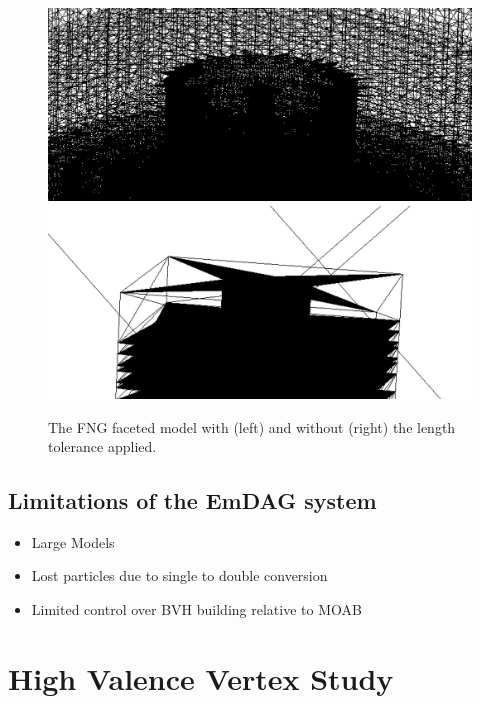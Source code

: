 \documentclass[10pt, a4paper]{article}
\begin{document}
\begin{figure}[H]
  \small
  \begin{center}
    \includegraphics[scale=0.15]{fng_len_tol.png}
    \includegraphics[scale=0.15]{fng_facet_tol.png}
    \caption{The FNG faceted model with (left) and without (right) the length tolerance applied.}
    \label{fng-faceted-models}
  \end{center}


\end{figure}



\subsection{Limitations of the EmDAG system}%

\begin{itemize}
\item Large Models
\item Lost particles due to single to double conversion
\item Limited control over BVH building relative to MOAB
\end{itemize}

\section{High Valence Vertex Study}%
\end{document}
